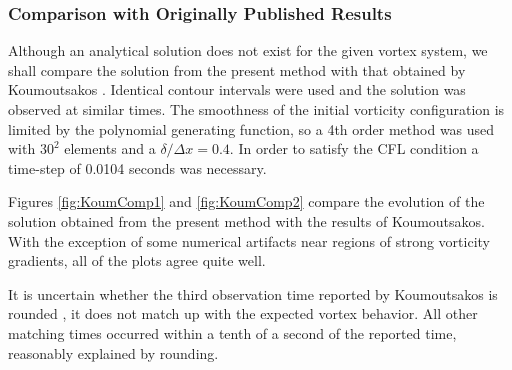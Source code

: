\documentclass[]{aiaa-tc}%
\begin{document}
\subsubsection{Comparison with Originally Published Results}\label{KoumComper}
Although an analytical solution does not exist for the given vortex system, we shall compare the solution from the present method with that obtained by Koumoutsakos \cite{Koum1997}. Identical contour intervals were used and the solution was observed at similar times. The smoothness of the initial vorticity configuration is limited by the polynomial generating function, so a 4th order method was used with $30^2$ elements and a $\delta/\Delta x=0.4$. In order to satisfy the CFL condition a time-step of 0.0104 seconds was necessary.

Figures \ref{fig:KoumComp1} and \ref{fig:KoumComp2} compare the evolution of the solution obtained from the present method with the results of Koumoutsakos. With the exception of some numerical artifacts near regions of strong vorticity gradients, all of the plots agree quite well.

It is uncertain whether the third observation time reported by Koumoutsakos is rounded \cite{Koum1997}, it does not match up with the expected vortex behavior. All other matching times occurred within a tenth of a second of the reported time, reasonably explained by rounding.
\end{document}
